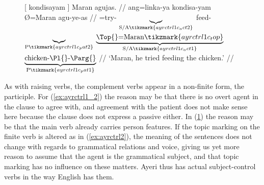 \begin{figure}
\a\label{ex:ayrctrl1_3}\begingl[aboveglcskip=1.5em, aboveglftskip=2.5em]
	 \textup{[} {} kondisayam {} \textup{]}
		Maran agujas. //
	\glb ang=linka-ya {} {} kondisa-yam {} {} Ø=Maran agu-ye-as //
	\glc \AgtT{}=try-\TsgM{}%
		{}
		$\underbrace{}_{\text{S/A}%
			\tikzmark{ayrctrl1c_act2}%
		}$
		feed-\Ptcp{}
		$\underbrace{}_{\text{P}%
			\tikzmark{ayrctrl1c_pat2}%
		}$
		{}
		$\underbrace{\text{\Top{}=Maran}%
			\tikzmark{ayrctrl1c_top}%
		}_{\text{S/A}%
			\tikzmark{ayrctrl1c_act1}%
		}$
		$\underbrace{\text{chicken-\Pl{}-\Parg{}}}_{\text{P}%
			\tikzmark{ayrctrl1c_pat1}%
		}$
		//
	\glft `Maran, he tried feeding the chicken.' //
\endgl
{}

\xe
\end{figure}

As with raising verbs, the complement verbs appear in a non-finite form, the
participle. For (\ref{ex:ayrctrl1_2}) the reason may be that there is no overt
agent in the clause to agree with, and agreement with the patient does not make
sense here because the clause does not express a passive either. In
(\ref{ex:ayrctrl1_3}) the reason may be that the main verb already carries
person features. If the topic marking on the finite verb is altered as in
(\ref{ex:ayrctrl2}), the meaning of the sentences does not change with regards
to grammatical relations and voice, giving us yet more reason to assume that
the agent is the grammatical subject, and that topic marking has no influence
on these matters. Ayeri thus has actual subject-control verbs in the way
English has them.

